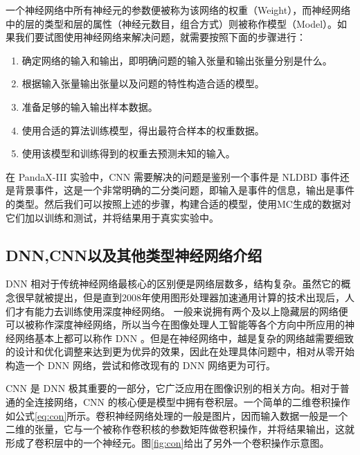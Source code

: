 一个神经网络中所有神经元的参数便被称为该网络的权重（Weight），而神经网络中的层的类型和层的属性（神经元数目，组合方式）则被称作模型（Model）。如果我们要试图使用神经网络来解决问题，就需要按照下面的步骤进行：
\begin{enumerate}
    \item 确定网络的输入和输出，即明确问题的输入张量和输出张量分别是什么。
    \item 根据输入张量输出张量以及问题的特性构造合适的模型。
    \item 准备足够的输入输出样本数据。
    \item 使用合适的算法训练模型，得出最符合样本的权重数据。
    \item 使用该模型和训练得到的权重去预测未知的输入。
\end{enumerate}
在 PandaX-III 实验中，CNN 需要解决的问题是鉴别一个事件是 NLDBD 事件还是背景事件，这是一个非常明确的二分类问题，即输入是事件的信息，输出是事件的类型。然后我们可以按照上述的步骤，构建合适的模型，使用MC生成的数据对它们加以训练和测试，并将结果用于真实实验中。

\subsection{DNN,CNN以及其他类型神经网络介绍}

DNN 相对于传统神经网络最核心的区别便是网络层数多，结构复杂。虽然它的概念很早就被提出，但是直到2008年使用图形处理器加速通用计算的技术出现后，人们才有能力去训练使用深度神经网络。 一般来说拥有两个及以上隐藏层的网络便可以被称作深度神经网络，所以当今在图像处理人工智能等各个方向中所应用的神经网络基本上都可以称作 DNN 。但是在神经网络中，越是复杂的网络越需要细致的设计和优化调整来达到更为优异的效果，因此在处理具体问题中，相对从零开始构造一个 DNN 网络，尝试和修改现有的 DNN 网络更为可行。

CNN 是 DNN 极其重要的一部分，它广泛应用在图像识别的相关方向。相对于普通的全连接网络，CNN 的核心便是模型中拥有卷积层。一个简单的二维卷积操作如公式\ref{eq:con}所示。卷积神经网络处理的一般是图片，因而输入数据一般是一个二维的张量，它与一个被称作卷积核的参数矩阵做卷积操作，并将结果输出，这就形成了卷积层中的一个神经元。图\ref{fig:con}给出了另外一个卷积操作示意图。

